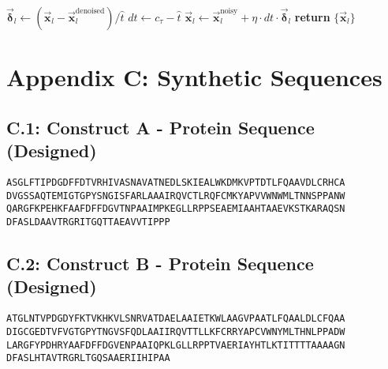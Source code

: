 \begin{algorithm}
{\begin{algorithmic}[1]
        
            \State $\vec{\boldsymbol{\delta}}_l \gets (\vec{\mathbf{x}}_l - \vec{\mathbf{x}}_l^{\text{denoised}})/\hat{t}$
            \State $dt \gets c_\tau - \hat{t}$
            \State $\vec{\mathbf{x}}_l \gets \vec{\mathbf{x}}_l^{\text{noisy}} + \eta \cdot dt \cdot \vec{\boldsymbol{\delta}}_l$
        \EndFor
        \State \textbf{return} $\{\vec{\mathbf{x}}_l\}$
        \end{algorithmic}
    }
    \label{alg:af3_sym}
\end{algorithm}
\section*{Appendix C: Synthetic Sequences}\label{appendix:synthetic_seqs}
\subsection*{C.1: Construct A - Protein Sequence (Designed)}
\begin{verbatim}
ASGLFTIPDGDFFDTVRHIVASNAVATNEDLSKIEALWKDMKVPTDTLFQAAVDLCRHCA
DVGSSAQTEMIGTGPYSNGISFARLAAAIRQVCTLRQFCMKYAPVVWNWMLTNNSPPANW
QARGFKPEHKFAAFDFFDGVTNPAAIMPKEGLLRPPSEAEMIAAHTAAEVKSTKARAQSN
DFASLDAAVTRGRITGQTTAEAVVTIPPP
\end{verbatim}
\subsection*{C.2: Construct B - Protein Sequence (Designed)}
\begin{verbatim}
ATGLNTVPDGDYFKTVKHKVLSNRVATDAELAAIETKWLAAGVPAATLFQAALDLCFQAA
DIGCGEDTVFVGTGPYTNGVSFQDLAAIIRQVTTLLKFCRRYAPCVWNYMLTHNLPPADW
LARGFYPDHRYAAFDFFDGVENPAAIQPKLGLLRPPTVAERIAYHTLKTITTTTAAAAGN
DFASLHTAVTRGRLTGQSAAERIIHIPAA
\end{verbatim}
